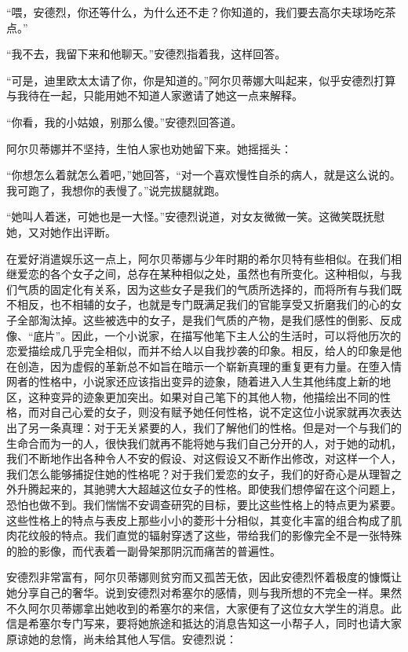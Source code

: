 \par “喂，安德烈，你还等什么，为什么还不走？你知道的，我们要去高尔夫球场吃茶点。”
\par “我不去，我留下来和他聊天。”安德烈指着我，这样回答。
\par “可是，迪里欧太太请了你，你是知道的。”阿尔贝蒂娜大叫起来，似乎安德烈打算与我待在一起，只能用她不知道人家邀请了她这一点来解释。
\par “你看，我的小姑娘，别那么傻。”安德烈回答道。
\par 阿尔贝蒂娜并不坚持，生怕人家也劝她留下来。她摇摇头：
\par “你想怎么着就怎么着吧，”她回答，“对一个喜欢慢性自杀的病人，就是这么说的。我可跑了，我想你的表慢了。”说完拔腿就跑。
\par “她叫人着迷，可她也是一大怪。”安德烈说道，对女友微微一笑。这微笑既抚慰她，又对她作出评断。
\par 在爱好消遣娱乐这一点上，阿尔贝蒂娜与少年时期的希尔贝特有些相似。在我们相继爱恋的各个女子之间，总存在某种相似之处，虽然也有所变化。这种相似，与我们气质的固定化有关系，因为这些女子是我们的气质所选择的，而将所有与我们既不相反，也不相辅的女子，也就是专门既满足我们的官能享受又折磨我们的心的女子全部淘汰掉。这些被选中的女子，是我们气质的产物，是我们感性的倒影、反成像、“底片”。因此，一个小说家，在描写他笔下主人公的生活时，可以将他历次的恋爱描绘成几乎完全相似，而并不给人以自我抄袭的印象。相反，给人的印象是他在创造，因为虚假的革新总不如旨在暗示一个崭新真理的重复更有力量。在堕入情网者的性格中，小说家还应该指出变异的迹象，随着进入人生其他纬度上新的地区，这种变异的迹象更加突出。如果对自己笔下的其他人物，他描绘出不同的性格，而对自己心爱的女子，则没有赋予她任何性格，说不定这位小说家就再次表达出了另一条真理：对于无关紧要的人，我们了解他们的性格。但是对一个与我们的生命合而为一的人，很快我们就再不能将她与我们自己分开的人，对于她的动机，我们不断地作出各种令人不安的假设、对这假设又不断作出修改，对这样一个人，我们怎么能够捕捉住她的性格呢？对于我们爱恋的女子，我们的好奇心是从理智之外升腾起来的，其驰骋大大超越这位女子的性格。即使我们想停留在这个问题上，恐怕也做不到。我们惴惴不安调查研究的目标，要比这些性格上的特点更为紧要。这些性格上的特点与表皮上那些小小的菱形十分相似，其变化丰富的组合构成了肌肉花纹般的特点。我们直觉的辐射穿透了这些，带给我们的影像完全不是一张特殊的脸的影像，而代表着一副骨架那阴沉而痛苦的普遍性。
\par 安德烈非常富有，阿尔贝蒂娜则贫穷而又孤苦无依，因此安德烈怀着极度的慷慨让她分享自己的奢华。说到安德烈对希塞尔的感情，则与我所想的不完全一样。果然不久阿尔贝蒂娜拿出她收到的希塞尔的来信，大家便有了这位女大学生的消息。此信是希塞尔专门写来，要将她旅途和抵达的消息告知这一小帮子人，同时也请大家原谅她的怠惰，尚未给其他人写信。安德烈说：
